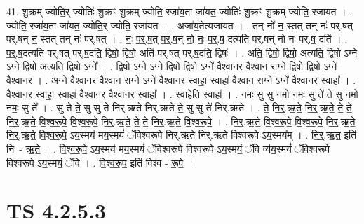 \documentclass[17pt]{extarticle}
\begin{document}
41. शु॒क्रम् ज्योति॒र् ज्योतिः॑ शु॒क्रꣳ शु॒क्रम् ज्योति॒ रजा॑य॒ता जा॑यत॒ ज्योतिः॑ शु॒क्रꣳ शु॒क्रम् ज्योति॒ रजा॑यत । . ज्योति॒ रजा॑य॒ता जा॑यत॒ ज्योति॒र् ज्योति॒ रजा॑यत । . अजा॑य॒तेत्यजा॑यत । . तन् नो॑ न॒ स्तत् तन् नः॑ पर्.षत् पर्.षन् न॒ स्तत् तन् नः॑ पर्.षत् । . नः॒ प॒र्॒.ष॒त् प॒र्॒.ष॒न् नो॒ नः॒ प॒र्॒.ष॒ दत्यति॑ पर्.षन् नो नः पर्.ष॒ दति॑ । . प॒र्॒.ष॒दत्यति॑ पर्.षत् पर्.ष॒दति॒ द्विषो॒ द्विषो॒ अति॑ पर्.षत् पर्.ष॒दति॒ द्विषः॑ । . अति॒ द्विषो॒ द्विषो॒ अत्यति॒ द्विषो ऽग्ने ऽग्ने॒ द्विषो॒ अत्यति॒ द्विषो ऽग्ने᳚ । . द्विषो ऽग्ने ऽग्ने॒ द्विषो॒ द्विषो ऽग्ने॑ वैश्वानर वैश्वान॒ राग्ने॒ द्विषो॒ द्विषो ऽग्ने॑ वैश्वानर । . अग्ने॑ वैश्वानर वैश्वान॒ राग्ने ऽग्ने॑ वैश्वानर॒ स्वाहा॒ स्वाहा॑ वैश्वान॒ राग्ने ऽग्ने॑ वैश्वानर॒ स्वाहा᳚ । . वै॒श्वा॒न॒र॒ स्वाहा॒ स्वाहा॑ वैश्वानर वैश्वानर॒ स्वाहा᳚ । . स्वाहेति॒ स्वाहा᳚ । . नमः॒ सु सु नमो॒ नमः॒ सु ते॑ ते॒ सु नमो॒ नमः॒ सु ते᳚ । . सु ते॑ ते॒ सु सु ते॑ निर्.ऋते निर्.ऋते ते॒ सु सु ते॑ निर्.ऋते । . ते॒ नि॒र्॒.ऋ॒ते॒ नि॒र्॒.ऋ॒ते॒ ते॒ ते॒ नि॒र्॒.ऋ॒ते॒ वि॒श्व॒रू॒पे॒ वि॒श्व॒रू॒पे॒ नि॒र्॒.ऋ॒ते॒ ते॒ ते॒ नि॒र्॒.ऋ॒ते॒ वि॒श्व॒रू॒पे॒ । . नि॒र्॒.ऋ॒ते॒ वि॒श्व॒रू॒पे॒ वि॒श्व॒रू॒पे॒ नि॒र्॒.ऋ॒ते॒ नि॒र्॒.ऋ॒ते॒ वि॒श्व॒रू॒पे॒ ऽय॒स्मय॑ मय॒स्मयं॑ ॅविश्वरूपे निर्.ऋते निर्.ऋते विश्वरूपे ऽय॒स्मय᳚म् । . नि॒र्॒.ऋ॒त॒ इति॑ निः - ऋ॒ते॒ । . वि॒श्व॒रू॒पे॒ ऽय॒स्मय॑ मय॒स्मयं॑ ॅविश्वरूपे विश्वरूपे ऽय॒स्मयं॒ ॅवि व्य॑य॒स्मयं॑ ॅविश्वरूपे विश्वरूपे ऽय॒स्मयं॒ ॅवि । . वि॒श्व॒रू॒प॒ इति॑ विश्व - रू॒पे॒ । \newline
\pagebreak
{}

\section{ TS 4.2.5.3 }
\end{document}
